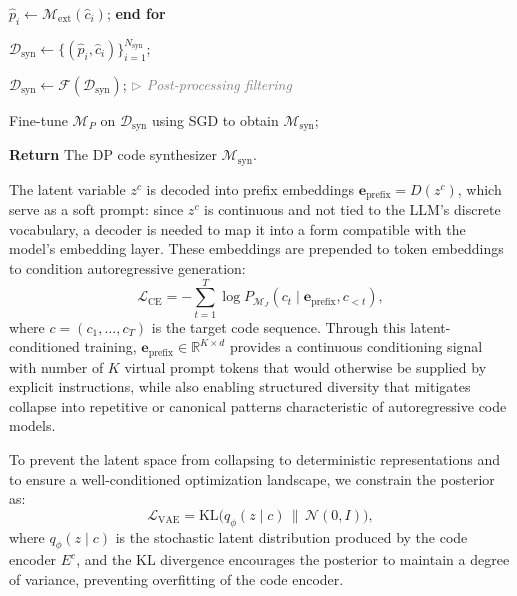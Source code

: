 \documentclass{article}
\theoremstyle{plain}
\theoremstyle{definition}
\theoremstyle{remark}
\begin{document}
\begin{algorithm}[t]
\begin{algorithmic}[1]
\STATE \quad $\hat{p}_i \gets \mathcal{M}_{\text{ext}}(\hat{c}_i)$;
\STATE \textbf{end for}

\STATE $\mathcal{D}_{\text{syn}} \gets \{(\hat{p}_i, \hat{c}_i)\}_{i=1}^{N_{\text{syn}}}$;

\STATE $\mathcal{D}_{\text{syn}} \gets \mathcal{F}(\mathcal{D}_{\text{syn}})$; 
\hfill {\small\textcolor{gray}{\textit{$\triangleright$ Post-processing filtering}}}

\STATE Fine-tune $\mathcal{M}_P$ on $\mathcal{D}_{\text{syn}}$ using SGD to obtain $\mathcal{M}_{\text{syn}}$;

\STATE \textbf{Return} The DP code synthesizer $\mathcal{M}_{\text{syn}}$.

\end{algorithmic}
\end{algorithm}


The latent variable $z^c$ is decoded into prefix embeddings $\mathbf{e}_{\text{prefix}} = D(z^c)$, which serve as a soft prompt: since $z^c$ is continuous and not tied to the LLM’s discrete vocabulary, a decoder is needed to map it into a form compatible with the model’s embedding layer. These embeddings are prepended to token embeddings to condition autoregressive generation:
\begin{equation}
\mathcal{L}_{\text{CE}} = - \sum_{t=1}^T \log P_{\mathcal{M}_J}(c_t \mid \mathbf{e}_{\text{prefix}}, c_{<t}),
\end{equation}
where $c = (c_1, \dots, c_T)$ is the target code sequence. 
Through this latent-conditioned training, $\mathbf{e}_{\text{prefix}}\in \mathbb{R}^{K \times d}$ provides a continuous conditioning signal with number of $K$ virtual prompt tokens that would otherwise be supplied by explicit instructions, while also enabling structured diversity that mitigates collapse into repetitive or canonical patterns characteristic of autoregressive code models.

To prevent the latent space from collapsing to deterministic representations and to ensure a well-conditioned optimization landscape, we constrain the posterior as:
\begin{equation}
\mathcal{L}_{\text{VAE}} = \mathrm{KL}\big(q_\phi(z \mid c)\,\|\,\mathcal{N}(0, I)\big),
\end{equation}
where $q_\phi(z \mid c)$ is the stochastic latent distribution produced by the code encoder $E^c$, and the KL divergence encourages the posterior to maintain a degree of variance, preventing overfitting of the code encoder.
\end{document}
